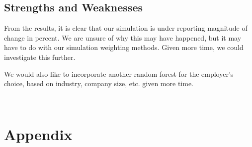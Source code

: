 \documentclass{article}
\begin{document}
\subsection{Strengths and Weaknesses}
From the results, it is clear that our simulation is under reporting magnitude of change in percent. We are unsure of why this may have happened, but it may have to do with our simulation weighting methods. Given more time, we could investigate this further.



We would also like to incorporate another random forest for the employer’s choice, based on industry, company size, etc. given more time.

\






\section{Appendix}
\end{document}

